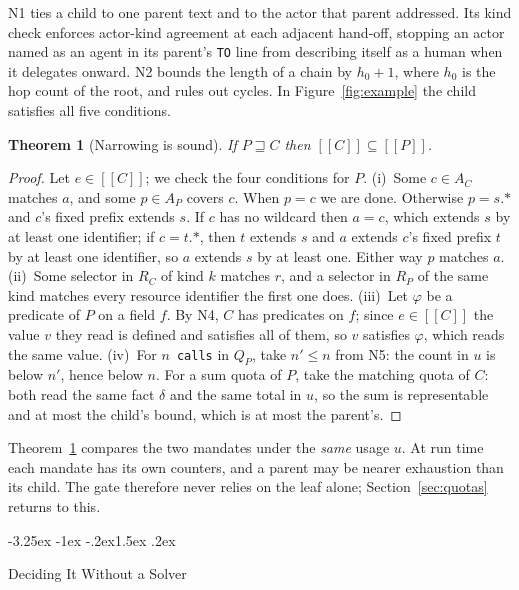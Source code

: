 \documentclass[10pt,twocolumn]{article}
\makeatletter
\theoremstyle{plain}
\newtheorem{theorem}{Theorem}
\theoremstyle{definition}
\newcommand{\sem}[1]{[\![#1]\!]}
\newcommand{\covers}{\sqsupseteq}
\renewcommand\subsection{\@startsection{subsection}{2}{\z@}%
  {-3.25ex \@plus -1ex \@minus -.2ex}{1.5ex \@plus .2ex}%
  {\normalfont\large\bfseries\raggedright}}
\makeatother
\begin{document}
N1 ties a child to one parent text and to the actor that parent addressed. Its kind check enforces actor-kind agreement at each adjacent hand-off, stopping an actor named as an agent in its parent's \texttt{TO} line from describing itself as a human when it delegates onward. N2 bounds the length of a chain by $h_0 + 1$, where $h_0$ is the hop count of the root, and rules out cycles. In Figure~\ref{fig:example} the child satisfies all five conditions.

\begin{theorem}[Narrowing is sound]
\label{thm:sound}
If $P \covers C$ then \mbox{$\sem{C} \subseteq \sem{P}$}.
\end{theorem}

\begin{proof}
Let $e \in \sem{C}$; we check the four conditions for $P$. (i)~Some $c \in A_C$ matches $a$, and some $p \in A_P$ covers $c$. When $p = c$ we are done. Otherwise $p = s\texttt{.*}$ and $c$'s fixed prefix extends $s$. If $c$ has no wildcard then $a = c$, which extends $s$ by at least one identifier; if $c = t\texttt{.*}$, then $t$ extends $s$ and $a$ extends $c$'s fixed prefix $t$ by at least one identifier, so $a$ extends $s$ by at least one. Either way $p$ matches $a$. (ii)~Some selector in $R_C$ of kind $k$ matches $r$, and a selector in $R_P$ of the same kind matches every resource identifier the first one does. (iii)~Let $\varphi$ be a predicate of $P$ on a field $f$. By N4, $C$ has predicates on $f$; since $e \in \sem{C}$ the value $v$ they read is defined and satisfies all of them, so $v$ satisfies $\varphi$, which reads the same value. (iv)~For $n$~\texttt{calls} in $Q_P$, take $n' \le n$ from N5: the count in $u$ is below $n'$, hence below $n$. For a sum quota of $P$, take the matching quota of $C$: both read the same fact $\delta$ and the same total in $u$, so the sum is representable and at most the child's bound, which is at most the parent's.
\end{proof}

Theorem~\ref{thm:sound} compares the two mandates under the \emph{same} usage $u$. At run time each mandate has its own counters, and a parent may be nearer exhaustion than its child. The gate therefore never relies on the leaf alone; Section~\ref{sec:quotas} returns to this.

\subsection{Deciding It Without a Solver}
\label{sec:decide}
\end{document}
